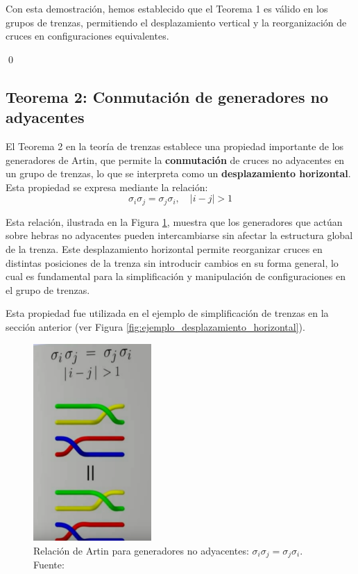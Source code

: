 Con esta demostración, hemos establecido que el Teorema 1 es válido en los grupos de trenzas, permitiendo el desplazamiento vertical y la reorganización de cruces en configuraciones equivalentes.

\hfill \qed

\newpage

\subsection{Teorema 2: Conmutación de generadores no adyacentes}

El Teorema 2 en la teoría de trenzas establece una propiedad importante de los generadores de Artin, que permite la \textbf{conmutación} de cruces no adyacentes en un grupo de trenzas, lo que se interpreta como un \textbf{desplazamiento horizontal}. Esta propiedad se expresa mediante la relación:
\[
\sigma_i \sigma_j = \sigma_j \sigma_i, \quad |i - j| > 1
\]

Esta relación, ilustrada en la Figura \ref{fig:relacion_artin_2}, muestra que los generadores que actúan sobre hebras no adyacentes pueden intercambiarse sin afectar la estructura global de la trenza. Este desplazamiento horizontal permite reorganizar cruces en distintas posiciones de la trenza sin introducir cambios en su forma general, lo cual es fundamental para la simplificación y manipulación de configuraciones en el grupo de trenzas.

Esta propiedad fue utilizada en el ejemplo de simplificación de trenzas en la sección anterior (ver Figura \ref{fig:ejemplo_desplazamiento_horizontal}).

\begin{figure}[!h]
    \centering
    \includegraphics[width=0.4\textwidth]{figures/chapters/2_artin/teorema2.png}
    \caption{Relación de Artin para generadores no adyacentes: \(\sigma_i \sigma_j = \sigma_j \sigma_i\). Fuente: \cite{esterdalvitBraidsChapter12013}}
    \label{fig:relacion_artin_2}
\end{figure}

